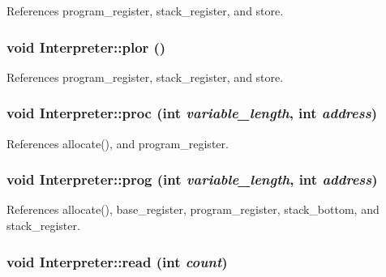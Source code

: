 References program\_\-register, stack\_\-register, and store.

\hypertarget{classInterpreter_a5f0454582ef1e52e2fcaee1b703553b8}{
\subsubsection[{plor}]{\setlength{\rightskip}{0pt plus 5cm}void Interpreter::plor ()}}
\label{classInterpreter_a5f0454582ef1e52e2fcaee1b703553b8}


References program\_\-register, stack\_\-register, and store.

\hypertarget{classInterpreter_a559d265d75195aab3e0390b62d35626f}{
\subsubsection[{proc}]{\setlength{\rightskip}{0pt plus 5cm}void Interpreter::proc (int {\em variable\_\-length}, \/  int {\em address})}}
\label{classInterpreter_a559d265d75195aab3e0390b62d35626f}


References allocate(), and program\_\-register.

\hypertarget{classInterpreter_a26e7331de08ed5f4aa54e2cc0db83798}{
\subsubsection[{prog}]{\setlength{\rightskip}{0pt plus 5cm}void Interpreter::prog (int {\em variable\_\-length}, \/  int {\em address})}}
\label{classInterpreter_a26e7331de08ed5f4aa54e2cc0db83798}


References allocate(), base\_\-register, program\_\-register, stack\_\-bottom, and stack\_\-register.

\hypertarget{classInterpreter_a499070c59ca4127e57ad621bd489645c}{
\subsubsection[{read}]{\setlength{\rightskip}{0pt plus 5cm}void Interpreter::read (int {\em count})}}
\label{classInterpreter_a499070c59ca4127e57ad621bd489645c}



